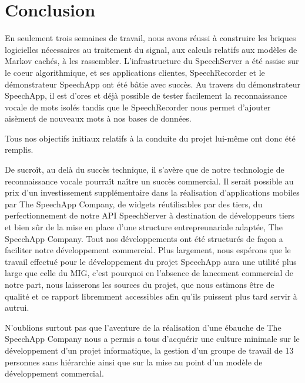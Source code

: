 \part*{Conclusion}


En seulement trois semaines de travail, nous avons réussi à construire les briques logicielles nécessaires au traitement du signal, aux calculs relatifs aux modèles de Markov cachés, à les rassembler. L'infrastructure du SpeechServer a été assise sur le coeur algorithmique, et ses applications clientes, SpeechRecorder et le démonstrateur SpeechApp ont été bâtie avec succès.
Au travers du démonstrateur SpeechApp, il est d'ores et déjà possible de tester facilement la reconnaissance vocale de mots isolés tandis que le SpeechRecorder nous permet d'ajouter aisèment de nouveaux mots à nos bases de données.

\bigskip{}

Tous nos objectifs initiaux relatifs à la conduite du projet lui-même ont donc été remplis.

\bigskip{}

De sucroît, au delà du succès technique, il s'avère que de notre technologie de reconnaissance vocale pourraît naître un succès commercial. Il serait possible au prix d'un investissement supplémentaire dans la réalisation d'applications mobiles par The SpeechApp Company, de widgets réutilisables par des tiers, du perfectionnement de notre API SpeechServer à destination de développeurs tiers et bien sûr de la mise en place d'une structure entrepreunariale adaptée, The SpeechApp Company.
Tout nos développements ont été structurés de façon a faciliter notre développement commercial.
\smallskip{}
Plus largement, nous espérons que le travail effectué pour le développement du projet SpeechApp aura une utilité plus large que celle du MIG, c'est pourquoi en l'absence de lancement commercial de notre part, nous laisserons les sources du projet, que nous estimons être de qualité et ce rapport libremment accessibles afin qu'ils puissent plus tard servir à autrui.

\bigskip{}

N'oublions surtout pas que l'aventure de la réalisation d'une ébauche de The SpeechApp Company nous a permis a tous d'acquérir une culture minimale sur le développement d'un projet informatique, la gestion d'un groupe de travail de 13 personnes sans hiérarchie ainsi que sur la mise au point d'un modèle de développement commercial.
